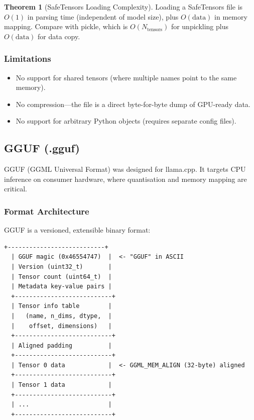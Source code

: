 \documentclass[11pt,a4paper]{article}
\theoremstyle{definition}
\newtheorem{theorem}{Theorem}[section]
\begin{document}
\begin{theorem}[SafeTensors Loading Complexity]
	Loading a SafeTensors file is $O(1)$ in parsing time (independent of model size), plus $O(\text{data})$ in memory mapping. Compare with pickle, which is $O(N_{\text{tensors}})$ for unpickling plus $O(\text{data})$ for data copy.
\end{theorem}

\subsubsection{Limitations}

\begin{itemize}
	\item No support for shared tensors (where multiple names point to the same memory).
	\item No compression---the file is a direct byte-for-byte dump of GPU-ready data.
	\item No support for arbitrary Python objects (requires separate config files).
\end{itemize}

\subsection{GGUF (.gguf)}

GGUF (GGML Universal Format) was designed for llama.cpp. It targets CPU inference on consumer hardware, where quantisation and memory mapping are critical.

\subsubsection{Format Architecture}

GGUF is a versioned, extensible binary format:

\begin{lstlisting}[caption=GGUF binary layout]
  +---------------------------+
  | GGUF magic (0x46554747)  |  <- "GGUF" in ASCII
  | Version (uint32_t)       |
  | Tensor count (uint64_t)  |
  | Metadata key-value pairs |
  +---------------------------+
  | Tensor info table        |
  |   (name, n_dims, dtype,  |
  |    offset, dimensions)   |
  +---------------------------+
  | Aligned padding          |
  +---------------------------+
  | Tensor 0 data            |  <- GGML_MEM_ALIGN (32-byte) aligned
  +---------------------------+
  | Tensor 1 data            |
  +---------------------------+
  | ...                      |
  +---------------------------+
\end{lstlisting}
\end{document}
